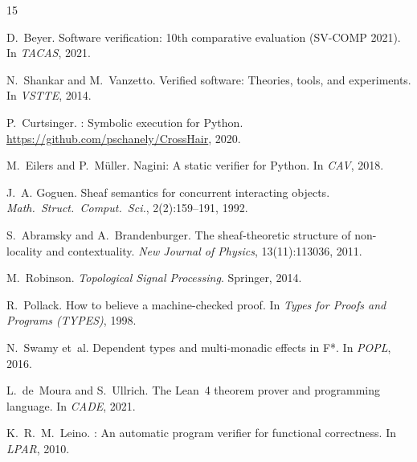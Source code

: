 \documentclass[11pt]{article}
\begin{document}

\begin{thebibliography}{15}

D.~Beyer.
\newblock Software verification: 10th comparative evaluation
({SV-COMP} 2021).
\newblock In \emph{TACAS}, 2021.

N.~Shankar and M.~Vanzetto.
\newblock Verified software: Theories, tools, and experiments.
\newblock In \emph{VSTTE}, 2014.

P.~Curtsinger.
: Symbolic execution for {Python}.
\newblock \url{https://github.com/pschanely/CrossHair}, 2020.

M.~Eilers and P.~M\"uller.
\newblock Nagini: A static verifier for {Python}.
\newblock In \emph{CAV}, 2018.

J.~A. Goguen.
\newblock Sheaf semantics for concurrent interacting objects.
\newblock \emph{Math.\ Struct.\ Comput.\ Sci.}, 2(2):159--191, 1992.

S.~Abramsky and A.~Brandenburger.
\newblock The sheaf-theoretic structure of non-locality and
contextuality.
\newblock \emph{New Journal of Physics}, 13(11):113036, 2011.

M.~Robinson.
\newblock \emph{Topological Signal Processing}.
\newblock Springer, 2014.

R.~Pollack.
\newblock How to believe a machine-checked proof.
\newblock In \emph{Types for Proofs and Programs (TYPES)}, 1998.

N.~Swamy et~al.
\newblock Dependent types and multi-monadic effects in {F*}.
\newblock In \emph{POPL}, 2016.

L.~de~Moura and S.~Ullrich.
\newblock The {Lean}~4 theorem prover and programming language.
\newblock In \emph{CADE}, 2021.

K.~R.~M.~Leino.
: An automatic program verifier for functional
correctness.
\newblock In \emph{LPAR}, 2010.

\end{thebibliography}
\end{document}
